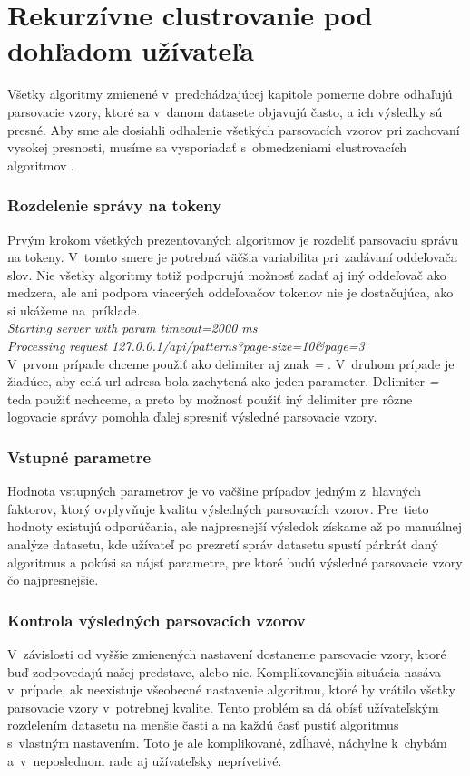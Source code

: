 \chapter{Rekurzívne clustrovanie pod dohľadom užívateľa}

Všetky algoritmy zmienené v~predchádzajúcej kapitole pomerne dobre odhaľujú parsovacie vzory, ktoré sa v~danom datasete objavujú často, a ich výsledky sú presné. Aby sme ale dosiahli odhalenie všetkých parsovacích vzorov pri zachovaní vysokej presnosti, musíme sa vysporiadať s~obmedzeniami clustrovacích algoritmov \parencite{Tovarnak2017}.

\subsection*{Rozdelenie správy na tokeny}
Prvým krokom všetkých prezentovaných algoritmov je rozdeliť parsovaciu správu na tokeny. V~tomto smere je potrebná väčšia variabilita pri~zadávaní oddeľovača slov. Nie všetky algoritmy totiž podporujú možnosť zadať aj iný oddeľovač ako medzera, ale ani podpora via\-cerých oddeľovačov tokenov nie je dostačujúca, ako si ukážeme na~príklade. \\

\indent \emph{Starting server with param timeout=2000 ms} \\
\indent \emph{Processing request 127.0.0.1/api/patterns?page-size=10\&page=3} \\

V~prvom prípade chceme použiť ako delimiter aj znak \emph{=} . V~druhom prípade je žiadúce, aby celá url adresa bola zachytená ako jeden para\-meter. Delimiter \emph{=} teda použiť nechceme, a preto by možnosť použiť iný delimiter pre rôzne logovacie správy pomohla ďalej spresniť výsledné parsovacie vzory.

\subsection*{Vstupné parametre}
Hodnota vstupných parametrov je vo vačšine prípadov jedným z~hlav\-ných faktorov, ktorý ovplyvňuje kvalitu výsledných parsovacích vzorov.
Pre~tieto hodnoty existujú odporúčania, ale najpresnejší výsledok získame až po manuálnej analýze datasetu, kde užívateľ po prezre\-tí správ datasetu spustí párkrát daný algoritmus a pokúsi sa nájsť parametre, pre ktoré budú výsledné parsovacie vzory čo najpresnej\-šie.

\subsection*{Kontrola výsledných parsovacích vzorov}
V~závislosti od vyššie zmienených nastavení dostaneme parsovacie vzory, ktoré buď zodpovedajú našej predstave, alebo nie. Komplikovanejšia situácia nasáva v~prípade, ak neexistuje všeobecné nastavenie algoritmu, ktoré by vrátilo všetky parsovacie vzory v~potrebnej kvalite. Tento problém sa dá obísť užívateľským rozdelením datasetu na menšie časti a na každú časť pustiť algoritmus s~vlastným nastavením. Toto je ale komplikované, zdĺhavé, náchylne k~chybám a~v~ne\-poslednom rade aj užívateľsky neprívetivé.

